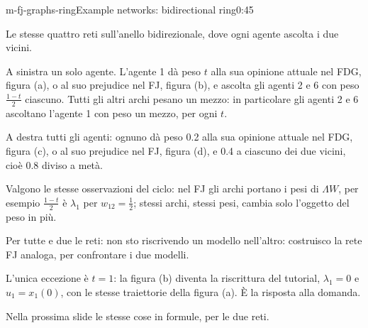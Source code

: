 \begin{slide}{m-fj-graphs-ring}{Example networks: bidirectional ring}{0:45 {\color{red}}}
  \begin{discorso}
    \item Le stesse quattro reti sull'anello bidirezionale, dove ogni agente ascolta i due vicini.
    \item A sinistra un solo agente. L'agente 1 dà peso $t$ alla sua opinione attuale nel FDG, figura (a), o al suo prejudice nel FJ, figura (b), e ascolta gli agenti 2 e 6 con peso $\frac{1-t}{2}$ ciascuno. Tutti gli altri archi pesano un mezzo: in particolare gli agenti 2 e 6 ascoltano l'agente 1 con peso un mezzo, per ogni $t$.
    \item A destra tutti gli agenti: ognuno dà peso 0.2 alla sua opinione attuale nel FDG, figura (c), o al suo prejudice nel FJ, figura (d), e 0.4 a ciascuno dei due vicini, cioè 0.8 diviso a metà.
    \item Valgono le stesse osservazioni del ciclo: {\color{blue}nel FJ gli archi portano i pesi di $\Lambda W$, per esempio $\frac{1-t}{2}$ è $\lambda_1$ per $w_{12}=\frac12$;} stessi archi, stessi pesi, cambia solo l'oggetto del peso in più.
    \item {\color{blue}Per tutte e due le reti: non sto riscrivendo un modello nell'altro: costruisco la rete FJ analoga, per confrontare i due modelli.}
    \item {\color{blue}L'unica eccezione è $t=1$: la figura (b) diventa la riscrittura del tutorial, $\lambda_1=0$ e $u_1=x_1(0)$, con le stesse traiettorie della figura (a). È la risposta alla domanda.}
    \item Nella prossima slide le stesse cose in formule, per le due reti.
  \end{discorso}
\end{slide}

